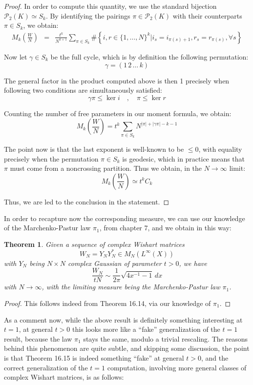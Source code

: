 \documentclass[12pt]{amsbook}
\newtheorem{theorem}{Theorem}[chapter]
\begin{document}
\begin{proof}
In order to compute this quantity, we use the standard bijection $\mathcal P_2(K)\simeq S_k$. By identifying the pairings $\pi\in\mathcal P_2(K)$ with their counterparts $\pi\in S_k$, we obtain:
\begin{eqnarray*}
M_k\left(\frac{W}{N}\right)
&=&\frac{t^k}{N^{k+1}}\sum_{\pi\in S_k}\#\left\{i,r\in\{1,\ldots,N\}^k\Big|i_s=i_{\pi(s)+1},r_s=r_{\pi(s)},\forall s\right\}
\end{eqnarray*}

Now let $\gamma\in S_k$ be the full cycle, which is by definition the following permutation:
$$\gamma=(1 \, 2 \, \ldots \, k)$$

The general factor in the product computed above is then 1 precisely when following two conditions are simultaneously satisfied:
$$\gamma\pi\leq\ker i\quad,\quad 
\pi\leq\ker r$$

Counting the number of free parameters in our moment formula, we obtain:
$$M_k\left(\frac{W}{N}\right)
=t^k\sum_{\pi\in S_k}N^{|\pi|+|\gamma\pi|-k-1}$$

The point now is that the last exponent is well-known to be $\leq 0$, with equality precisely when the permutation $\pi\in S_k$ is geodesic, which in practice means that $\pi$ must come from a noncrossing partition. Thus we obtain, in the $N\to\infty$ limit:
$$M_k\left(\frac{W}{N}\right)\simeq t^kC_k$$

Thus, we are led to the conclusion in the statement.
\end{proof}

In order to recapture now the corresponding measure, we can use our knowledge of the Marchenko-Pastur law $\pi_1$, from chapter 7, and we obtain in this way:

\begin{theorem}
Given a sequence of complex Wishart matrices
$$W_N=Y_NY_N^*\in M_N(L^\infty(X))$$
with $Y_N$ being $N\times N$ complex Gaussian of parameter $t>0$, we have
$$\frac{W_N}{tN}\sim\frac{1}{2\pi}\sqrt{4x^{-1}-1}\,dx$$
with $N\to\infty$, with the limiting measure being the Marchenko-Pastur law $\pi_1$.
\end{theorem}

\begin{proof}
This follows indeed from Theorem 16.14, via our knowledge of $\pi_1$.
\end{proof}

As a comment now, while the above result is definitely something interesting at $t=1$, at general $t>0$ this looks more like a ``fake'' generalization of the $t=1$ result, because the law $\pi_1$ stays the same, modulo a trivial rescaling. The reasons behind this phenomenon are quite subtle, and skipping some discussion, the point is that Theorem 16.15 is indeed something ``fake'' at general $t>0$, and the correct generalization of the $t=1$ computation, involving more general classes of complex Wishart matrices, is as follows:
\end{document}
